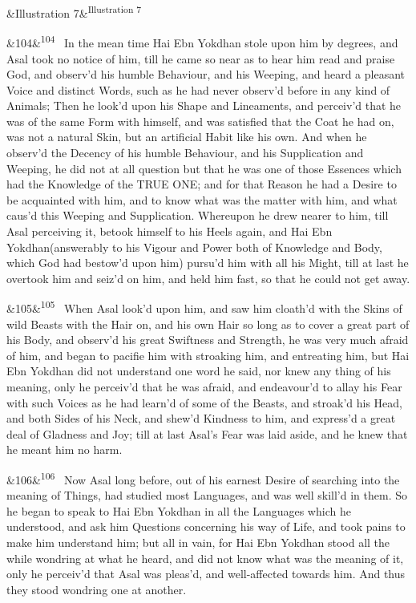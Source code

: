 \documentclass[12pt]{article}
\newcommand{\para}[1][]{\par\noindent\ifx&#1&\else\textsuperscript{\footnotesize #1}~\fi}
\begin{document}
\para [Illustration 7]

\para[104] In the mean time Hai Ebn Yokdhan stole upon him by degrees, and Asal took no notice of him, till he came so near as to hear him read and praise God, and observ'd his humble Behaviour, and his Weeping, and heard a pleasant Voice and distinct Words, such as he had never observ'd before in any kind of Animals; Then he look'd upon his Shape and Lineaments, and perceiv'd that he was of the same Form with himself, and was satisfied that the Coat he had on, was not a natural Skin, but an artificial Habit like his own. And when he observ'd the Decency of his humble Behaviour, and his Supplication and Weeping, he did not at all question but that he was one of those Essences which had the Knowledge of the TRUE ONE; and for that Reason he had a Desire to be acquainted with him, and to know what was the matter with him, and what caus'd this Weeping and Supplication. Whereupon he drew nearer to him, till Asal perceiving it, betook himself to his Heels again, and Hai Ebn Yokdhan(answerably to his Vigour and Power both of Knowledge and Body, which God had bestow'd upon him) pursu'd him with all his Might, till at last he overtook him and seiz'd on him, and held him fast, so that he could not get away.

\para[105] When Asal look'd upon him, and saw him cloath'd with the Skins of wild Beasts with the Hair on, and his own Hair so long as to cover a great part of his Body, and observ'd his great Swiftness and Strength, he was very much afraid of him, and began to pacifie him with stroaking him, and entreating him, but Hai Ebn Yokdhan did not understand one word he said, nor knew any thing of his meaning, only he perceiv'd that he was afraid, and endeavour'd to allay his Fear with such Voices as he had learn'd of some of the Beasts, and stroak'd his Head, and both Sides of his Neck, and shew'd Kindness to him, and express'd a great deal of Gladness and Joy; till at last Asal's Fear was laid aside, and he knew that he meant him no harm.

\para[106] Now Asal long before, out of his earnest Desire of searching into the meaning of Things, had studied most Languages, and was well skill'd in them. So he began to speak to Hai Ebn Yokdhan in all the Languages which he understood, and ask him Questions concerning his way of Life, and took pains to make him understand him; but all in vain, for Hai Ebn Yokdhan stood all the while wondring at what he heard, and did not know what was the meaning of it, only he perceiv'd that Asal was pleas'd, and well-affected towards him. And thus they stood wondring one at another.
\end{document}
